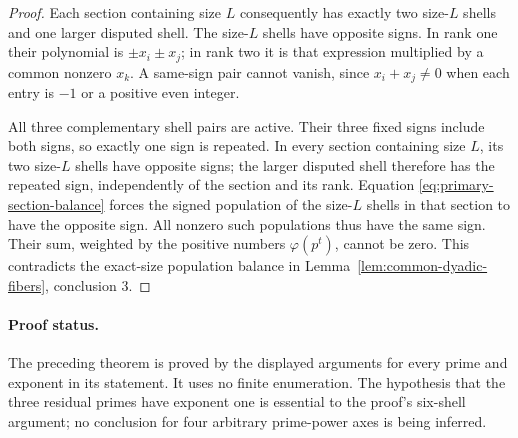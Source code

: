\begin{proof}
Each section containing size \(L\) consequently has exactly two
size-\(L\) shells and one larger disputed shell. The size-\(L\)
shells have opposite signs. In rank one their polynomial is
\(\pm x_i\pm x_j\); in rank two it is that expression multiplied
by a common nonzero \(x_k\). A same-sign pair cannot vanish, since
\(x_i+x_j\ne0\) when each entry is \(-1\) or a positive even
integer.

All three complementary shell pairs are active. Their three fixed
signs include both signs, so exactly one sign is repeated. In every
section containing size \(L\), its two size-\(L\) shells have
opposite signs; the larger disputed shell therefore has the repeated
sign, independently of the section and its rank. Equation
\eqref{eq:primary-section-balance} forces the signed population of
the size-\(L\) shells in that section to have the opposite sign.
All nonzero such populations thus have the same sign. Their sum,
weighted by the positive numbers \(\varphi(p^t)\), cannot be zero.
This contradicts the exact-size population balance in
Lemma~\ref{lem:common-dyadic-fibers}, conclusion 3.
\end{proof}

\paragraph{Proof status.}
The preceding theorem is proved by the displayed arguments for every
prime and exponent in its statement. It uses no finite enumeration.
The hypothesis that the three residual primes have exponent one is
essential to the proof's six-shell argument; no conclusion for four
arbitrary prime-power axes is being inferred.
